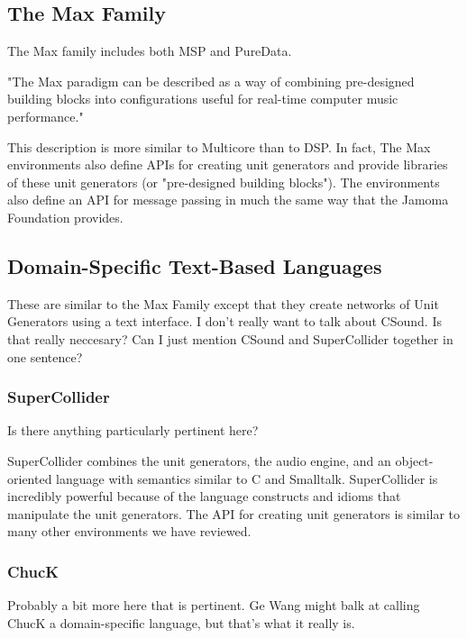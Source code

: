 \documentclass[twoside,10pt]{article}
\begin{document}
\subsection{The Max Family} %

The Max family includes both MSP\cite{Zicarelli:1998} and PureData\cite{Puckette:1996}.

"The Max paradigm can be described as a way of combining pre-designed building blocks into configurations useful for real-time computer music performance."\cite{Puckette:2002_max_at_17}

This description is more similar to Multicore than to DSP.  In fact, The Max environments also define APIs for creating unit generators and provide libraries of these unit generators (or "pre-designed building blocks").  The environments also define an API for message passing in much the same way that the Jamoma Foundation provides.



\subsection{Domain-Specific Text-Based Languages} %

These are similar to the Max Family except that they create networks of Unit Generators using a text interface.  I don't really want to talk about CSound.  Is that really neccesary?  Can I just mention CSound and SuperCollider together in one sentence?

\subsubsection{SuperCollider} %

Is there anything particularly pertinent here?\cite{McCartney:1996}

SuperCollider combines the unit generators, the audio engine, and an object-oriented language with semantics similar to C and Smalltalk.  SuperCollider is incredibly powerful because of the language constructs and idioms that manipulate the unit generators.  The API for creating unit generators is similar to many other environments we have reviewed.


\subsubsection{ChucK} %

Probably a bit more here that is pertinent.  Ge Wang might balk at calling ChucK a domain-specific language, but that's what it really is.
\end{document}
